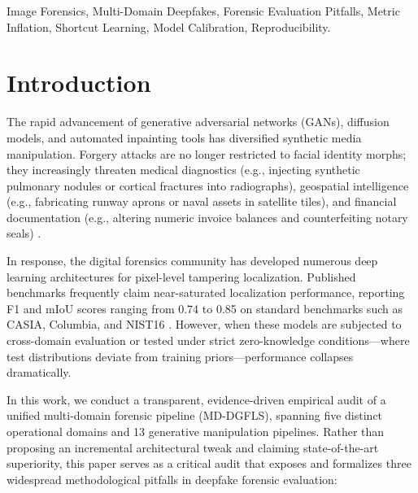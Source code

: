 \documentclass[conference]{IEEEtran}
\begin{document}
\begin{abstract}
Crucially, our audit demonstrates that domain-aware routing is the sole statistically confirmed architectural requirement: collapsing domain specialists into a single shared expert causes a significant performance drop ($\Delta\text{mIoU} = -0.1848, p = 1.94 \times 10^{-3}$). We conclude with four concrete guidelines for reliable multi-domain forensic benchmarking.
\end{abstract}

\begin{IEEEkeywords}
Image Forensics, Multi-Domain Deepfakes, Forensic Evaluation Pitfalls, Metric Inflation, Shortcut Learning, Model Calibration, Reproducibility.
\end{IEEEkeywords}

\section{Introduction}
The rapid advancement of generative adversarial networks (GANs), diffusion models, and automated inpainting tools has diversified synthetic media manipulation. Forgery attacks are no longer restricted to facial identity morphs; they increasingly threaten medical diagnostics (e.g., injecting synthetic pulmonary nodules or cortical fractures into radiographs), geospatial intelligence (e.g., fabricating runway aprons or naval assets in satellite tiles), and financial documentation (e.g., altering numeric invoice balances and counterfeiting notary seals) \cite{trufor,mantranet,mvssnet}.

In response, the digital forensics community has developed numerous deep learning architectures for pixel-level tampering localization. Published benchmarks frequently claim near-saturated localization performance, reporting F1 and mIoU scores ranging from 0.74 to 0.85 on standard benchmarks such as CASIA, Columbia, and NIST16 \cite{psccnet,catnet,trufor}. However, when these models are subjected to cross-domain evaluation or tested under strict zero-knowledge conditions—where test distributions deviate from training priors—performance collapses dramatically.

In this work, we conduct a transparent, evidence-driven empirical audit of a unified multi-domain forensic pipeline (MD-DGFLS), spanning five distinct operational domains and 13 generative manipulation pipelines. Rather than proposing an incremental architectural tweak and claiming state-of-the-art superiority, this paper serves as a critical audit that exposes and formalizes three widespread methodological pitfalls in deepfake forensic evaluation:
\end{document}
